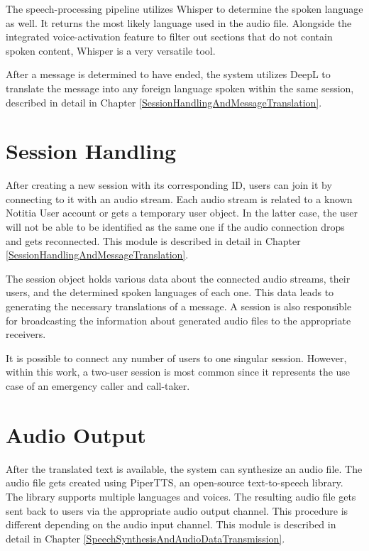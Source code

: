 The speech-processing pipeline utilizes Whisper to determine the spoken language as well. It returns the most likely 
language used in the audio file. Alongside the integrated voice-activation feature to filter out sections that do not 
contain spoken content, Whisper is a very versatile tool.

After a message is determined to have ended, the system utilizes DeepL to translate the message into any foreign 
language spoken within the same session, described in detail in Chapter \ref{SessionHandlingAndMessageTranslation}.


\section{Session Handling}

After creating a new session with its corresponding ID, users can join it by connecting to it with an audio stream. 
Each audio stream is related to a known Notitia User account or gets a temporary user object. In the latter case, the 
user will not be able to be identified as the same one if the audio connection drops and gets reconnected. 
This module is described in detail in Chapter \ref{SessionHandlingAndMessageTranslation}.

The session object holds various data about the connected audio streams, their users, and the determined spoken 
languages of each one. This data leads to generating the necessary translations of a message. A session is also 
responsible for broadcasting the information about generated audio files to the appropriate receivers.

It is possible to connect any number of users to one singular session. However, within this work, a two-user session is 
most common since it represents the use case of an emergency caller and call-taker.


\section{Audio Output}

After the translated text is available, the system can synthesize an audio file. The audio file gets created 
using PiperTTS, an open-source text-to-speech library. The library supports multiple languages and voices. The 
resulting audio file gets sent back to users via the appropriate audio output channel. This procedure is different 
depending on the audio input channel. This module is described in detail in Chapter 
\ref{SpeechSynthesisAndAudioDataTransmission}.

